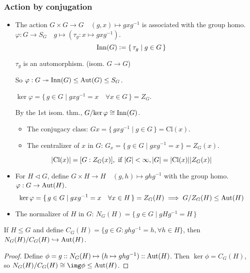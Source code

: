 \subsubsection{Action by conjugation}
\begin{itemize}
  \item The action $G \times G \to G \quad (g,x) \mapsto gxg^{-1}$ is
    associated with the group homo. $\varphi: G \to S_G \quad g \mapsto
    (\tau_g: x \mapsto gxg^{-1})$.
    \[
      \operatorname{Inn}(G) \vcentcolon= \{\, \tau_g \mid g \in G \,\}
    \]

    \begin{fact} 
      $\tau_g$ is an automorphism. (isom. $G \to G$)
    \end{fact}

    So $\varphi: G \twoheadrightarrow \operatorname{Inn}(G) \le \operatorname{Aut}(G) \le S_G$.

    $\ker\varphi = \{\, g\in G \mid gxg^{-1} = x \quad \forall x \in G \,\}
    = Z_G$.

    By the 1st isom. thm., ${G}/{\ker\varphi} \cong \operatorname{Inn}(G)$.
    \begin{itemize}
      \item The conjugacy class:
        $Gx = \{\, gxg^{-1} \mid g \in G \,\} = \text{Cl}(x)$.
      \item The centralizer of $x$ in $G$:
        $G_x = \{\, g \in G \mid gxg^{-1} = x \,\} = Z_G(x)$.
    \end{itemize}
    \[
      \lvert\text{Cl}(x)\rvert = [G:Z_G(x)], \text{~if~} \lvert G\rvert < \infty, 
      \lvert G\rvert = \lvert\text{Cl}(x)\rvert\lvert Z_G(x)\rvert
    \]
  \item For $H \lhd G$, define $G \times H \to H \quad (g, h) \mapsto ghg^{-1}$
    with the group homo. $\varphi: G \to \operatorname{Aut}(H)$.
    \[
      \ker\varphi = \{\, g\in G \mid gxg^{-1} = x \quad \forall x \in H \,\}
      = Z_G(H)
      \implies {G}/{Z_G(H)} \le \operatorname{Aut}(H)
    \]
  \item The normalizer of $H$ in $G$:
    $N_G(H) = \{\, g\in G \mid gHg^{-1} = H \,\}$

\end{itemize}
\begin{theorem}
  If $H \leq G$ and define $C_G(H) = \{ g \in G : g h g^{-1} = h, \forall h \in H \}$, then
  $N_G(H) / C_G(H) \hookrightarrow \operatorname{Aut}(H)$. 
\end{theorem}
\begin{proof}
  Define $\phi = g :: N_G(H) \mapsto (h \mapsto g h g^{-1}) :: \operatorname{Aut}(H)$. Then 
  $\ker \phi = C_G(H)$, so $N_G(H) / C_G(H) \cong \img \phi \leq \Aut(H)$.
\end{proof}
